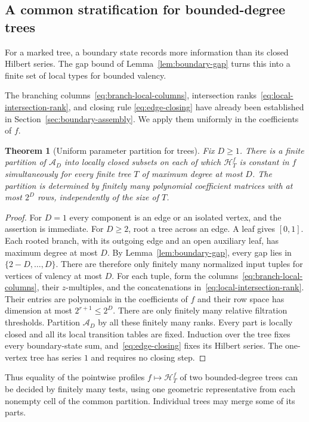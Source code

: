 \documentclass[reqno]{article}
\theoremstyle{plain} %
\newtheorem{theorem}{Theorem}[section]
\theoremstyle{definition}
\theoremstyle{remark}
\newcommand{\cA}{{\mathscr{A}}}
\newcommand{\hs}{\mathscr{H}}
\numberwithin{equation}{section}
\begin{document}
\subsection{A common stratification for bounded-degree trees}
\label{sec:uniform-trees}

For a marked tree, a boundary state records more information than its
closed Hilbert series. The gap bound of Lemma~\ref{lem:boundary-gap}
turns this into a finite set of local types for bounded valency.

The branching columns~\eqref{eq:branch-local-columns}, intersection
ranks~\eqref{eq:local-intersection-rank}, and closing rule
\eqref{eq:edge-closing} have already been established in
Section~\ref{sec:boundary-assembly}. We apply them uniformly in the
coefficients of $f$.

\begin{theorem}[Uniform parameter partition for trees]
\label{thm:uniform-tree-strata}
Fix $D\ge1$. There is a finite partition of $\cA_D$ into locally closed
subsets on each of which $\hs_T^f$ is constant in $f$ simultaneously for
every finite tree $T$ of maximum degree at most $D$.
The partition is determined by finitely many polynomial coefficient
matrices with at most $2^D$ rows, independently of the size of $T$.
\end{theorem}
\begin{proof}
For $D=1$ every component is an edge or an isolated vertex, and the
assertion is immediate. For $D\ge2$, root a tree across an edge.
A leaf gives $[0,1]$. Each rooted branch, with its outgoing edge and an
open auxiliary leaf, has maximum degree at most $D$. By
Lemma~\ref{lem:boundary-gap}, every gap lies in
$\{2-D,\ldots,D\}$. There are therefore only finitely many normalized
input tuples for vertices of valency at most $D$.
For each tuple, form the columns~\eqref{eq:branch-local-columns}, their
$z$-multiples, and the concatenations in~\eqref{eq:local-intersection-rank}.
Their entries are polynomials in the coefficients of $f$ and their row
space has dimension at most $2^{r+1}\le2^D$. There are only finitely many
relative filtration thresholds. Partition $\cA_D$ by all these finitely
many ranks. Every part is locally closed and all its local transition
tables are fixed. Induction over the tree fixes every boundary-state sum,
and~\eqref{eq:edge-closing} fixes its Hilbert series. The one-vertex tree
has series $1$ and requires no closing step.
\end{proof}

Thus equality of the pointwise profiles $f\mapsto\hs_T^f$ of two
bounded-degree trees can be decided by finitely many tests, using one
geometric representative from each nonempty cell of the common
partition. Individual trees may merge some of its parts.
\end{document}

